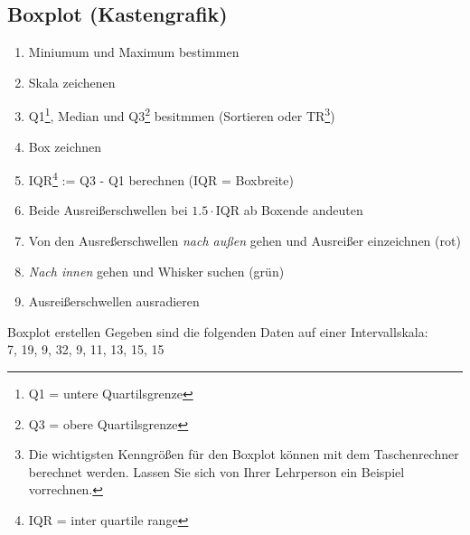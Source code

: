 \newpage

\subsection{Boxplot (Kastengrafik)}




\begin{rezept}{}{}
  \begin{enumerate}
  \item Miniumum und Maximum bestimmen
  \item Skala zeichenen
  \item Q1\footnote{Q1 = untere Quartilsgrenze},
    Median und Q3\footnote{Q3 = obere Quartilsgrenze} besitmmen (Sortieren
    oder TR\footnote{Die wichtigsten Kenngrößen für den Boxplot können mit dem Taschenrechner berechnet werden. Lassen Sie sich von Ihrer Lehrperson ein Beispiel vorrechnen.})
  \item Box zeichnen
  \item IQR\footnote{IQR = inter quartile range} := Q3 - Q1
    berechnen (IQR = Boxbreite)
  \item Beide Ausreißerschwellen bei $1.5\cdot$IQR ab Boxende andeuten
  \item Von den Ausreßerschwellen \textit{nach außen} gehen und
    Ausreißer einzeichnen (rot)
  \item \textit{Nach innen} gehen und Whisker suchen (grün)
  \item Ausreißerschwellen ausradieren
  \end{enumerate}
\end{rezept}
\newpage

\begin{beispiel}{Boxplot erstellen}{}
  Gegeben sind die folgenden Daten auf einer Intervallskala:\\
  7, 19, 9, 32, 9, 11, 13, 15, 15
\end{beispiel}

